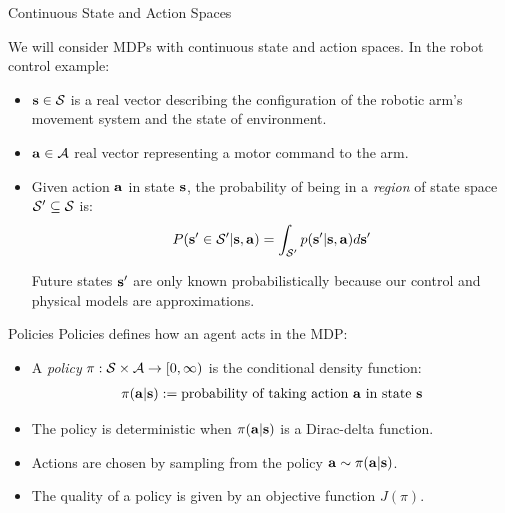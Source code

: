 \documentclass[]{beamer}
\begin{document}
\begin{frame}{Continuous State and Action Spaces}

We will consider MDPs with continuous state and action spaces. In the robot control example:
\begin{itemize}
    \item $\mbox{$\mbox{$\mathbf{s}$}$} \in \mathcal{S}$ is a real vector describing the configuration of the robotic arm's movement system and the state of environment.
    \item $\mbox{$\mbox{$\mathbf{a}$}$} \in \mathcal{A}$ real vector representing a motor command to the arm.
    \item Given action $\mbox{$\mbox{$\mathbf{a}$}$}$ in state $\mbox{$\mbox{$\mathbf{s}$}$}$, the probability of being in a \textit{region} of state space $\mathcal{S}' \subseteq \mathcal{S}$ is:
    \[ P(\mbox{$\mbox{$\mathbf{s}$}$}' \in \mathcal{S}' | \mbox{$\mbox{$\mathbf{s}$}$}, \mbox{$\mbox{$\mathbf{a}$}$}) = \int_{\mathcal{S}'} p(\mbox{$\mbox{$\mathbf{s}$}$}'| \mbox{$\mbox{$\mathbf{s}$}$}, \mbox{$\mbox{$\mathbf{a}$}$}) d\mbox{$\mbox{$\mathbf{s}$}$}' \]

    Future states $\mbox{$\mbox{$\mathbf{s}$}$}'$ are only known probabilistically because our control and physical models are approximations.
\end{itemize}

\end{frame}

\begin{frame}{Policies}
    Policies defines how an agent acts in the MDP:
    \begin{itemize}
        \item A \textit{policy} $\pi: \mathcal{S} \times \mathcal{A} \rightarrow [0, \infty)$ is the conditional density function:
        \begin{align*}
            \pi(\mbox{$\mbox{$\mathbf{a}$}$} | \mbox{$\mbox{$\mathbf{s}$}$}) := \text{probability of taking action $\mbox{$\mbox{$\mathbf{a}$}$}$ in state $\mbox{$\mbox{$\mathbf{s}$}$}$}
        \end{align*}
        \item The policy is deterministic when $\pi(\mbox{$\mbox{$\mathbf{a}$}$} | \mbox{$\mbox{$\mathbf{s}$}$})$ is a Dirac-delta function.
        \item Actions are chosen by sampling from the policy $\mbox{$\mbox{$\mathbf{a}$}$} \sim \pi(\mbox{$\mbox{$\mathbf{a}$}$} | \mbox{$\mbox{$\mathbf{s}$}$})$.
        \item The quality of a policy is given by an objective function $J(\pi)$.
    \end{itemize}

\end{frame}
\end{document}
